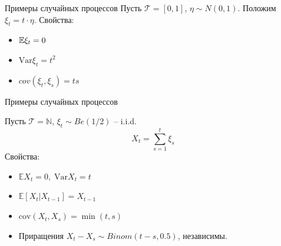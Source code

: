\documentclass{beamer}
\begin{document}
\begin{frame}{Примеры случайных процессов}
    Пусть $\mathcal{T}=[0,1]$, $\eta \sim N(0,1)$. Положим $\xi_t = t \cdot \eta$.
    Свойства:
    \begin{itemize}
        \item $\mathbb{E} \xi_t = 0$
        \item $\mathrm{Var} \xi_t = t^2$
        \item $cov(\xi_t, \xi_s) = ts$
    \end{itemize}
    

    \noindent{}
\end{frame}

\begin{frame}{Примеры случайных процессов}

    Пусть $\mathcal{T}=\mathbb{N}$, $\xi_t \sim Be(1/2)$ -- i.i.d.
    $$X_t = \sum_{s=1}^{t} \xi_s$$     
    Свойства:
    \begin{itemize}
        \item $\mathbb{E} X_t = 0, \; \mathrm{Var} X_t = t$
        \item $\mathbb{E} \left[ X_t | X_{t-1} \right] = X_{t-1}$
        \item $\mathrm{cov}(X_t, X_s) = \min(t, s)$
        \item Приращения $X_t - X_s \sim Binom(t-s, 0.5)$, независимы.
    \end{itemize}

\end{frame}
\end{document}
